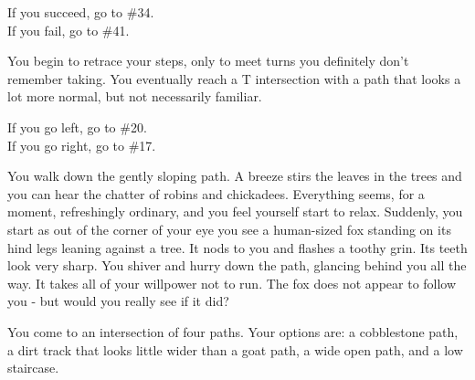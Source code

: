 \documentclass[green]{gl2018}
\begin{document}
\begin{large}
\begin{location}{8}
\begin{fromhere}
If you succeed, go to \#34.\\
  If you fail, go to \#41.
\end{fromhere}
\end{location}
\begin{location}{9}
You begin to retrace your steps, only to meet turns you definitely don't remember taking. You eventually reach a T intersection with a path that looks a lot more normal, but not necessarily familiar.
\begin{fromhere}
 If you go left, go to \#20.\\
 If you go right, go to \#17.
\end{fromhere}
\end{location}
\begin{location}{10}
You walk down the gently sloping path.  A breeze stirs the leaves in the trees and you can hear the chatter of robins and chickadees.  Everything seems, for a moment, refreshingly ordinary, and you feel yourself start to relax.  Suddenly, you start as out of the corner of your eye you see a human-sized fox standing on its hind legs leaning against a tree.  It nods to you and flashes a toothy grin.  Its teeth look very sharp.  You shiver and hurry down the path, glancing behind you all the way.  It takes all of your willpower not to run.  The fox does not appear to follow you - but would you really see if it did?

You come to an intersection of four paths.  Your options are: a cobblestone path, a dirt track that looks little wider than a goat path, a wide open path, and a low staircase.  


\end{location}
\end{large}
\end{document}
